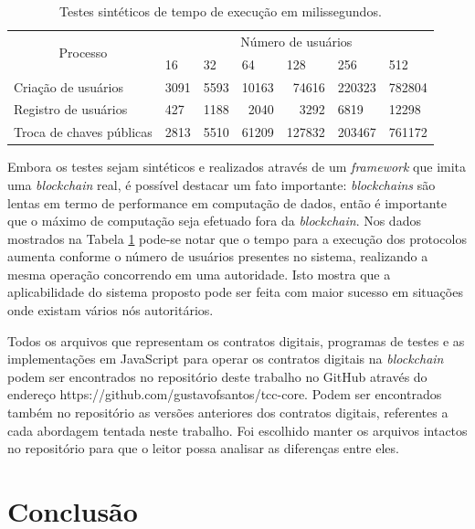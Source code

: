 \documentclass[tcc,capa]{texufpel}
\begin{document}
    \begin{table}[]
        \centering
        \begin{tabular}{|l|l|l|r|r|l|l|}
        \hline
        \multicolumn{1}{|c|}{\multirow{2}{*}{Processo}} & \multicolumn{6}{c|}{Número de usuários} \\ \cline{2-7} 
        \multicolumn{1}{|c|}{} & 16 & 32 & \multicolumn{1}{l|}{64} & \multicolumn{1}{l|}{128} & 256 & 512 \\ \hline
        Criação de usuários & 3091 & 5593 & 10163 & 74616 & 220323 & 782804 \\ \hline
        Registro de usuários & 427 & 1188 & 2040 & 3292 & 6819 & 12298 \\ \hline
        Troca de chaves públicas & 2813 & 5510 & 61209 & 127832 & 203467 & 761172 \\ \hline
        \end{tabular}
        \caption{Testes sintéticos de tempo de execução em milissegundos.}
        \label{tab:tempo-protocolos}
    \end{table}
    
    Embora os testes sejam sintéticos e realizados através de um \textit{framework} que imita uma \textit{blockchain} real, é possível destacar um fato importante: \textit{blockchains} são lentas em termo de performance em computação de dados, então é importante que o máximo de computação seja efetuado fora da \textit{blockchain}. Nos dados mostrados na Tabela \ref{tab:tempo-protocolos} pode-se notar que o tempo para a execução dos protocolos aumenta conforme o número de usuários presentes no sistema, realizando a mesma operação concorrendo em uma autoridade. Isto mostra que a aplicabilidade do sistema proposto pode ser feita com maior sucesso em situações onde existam vários nós autoritários.
    
    Todos os arquivos que representam os contratos digitais, programas de testes e as implementações em JavaScript para operar os contratos digitais na \textit{blockchain} podem ser encontrados no repositório deste trabalho no GitHub através do endereço https://github.com/gustavofsantos/tcc-core. Podem ser encontrados também no repositório as versões anteriores dos contratos digitais, referentes a cada abordagem tentada neste trabalho. Foi escolhido manter os arquivos intactos no repositório para que o leitor possa analisar as diferenças entre eles.  


\chapter{Conclusão}\label{chap:conclusao}
\end{document}
